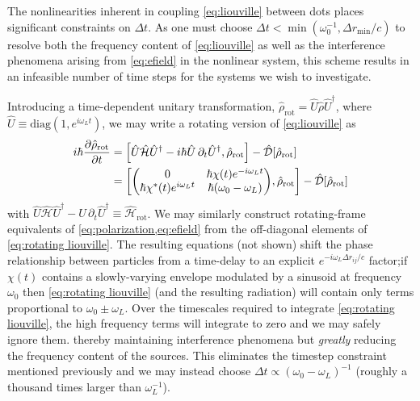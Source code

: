 \documentclass[conference]{IEEEtran}
\begin{document}
The nonlinearities inherent in coupling \cref{eq:liouville} between dots places significant constraints on $\Delta t$.
As one must choose $\Delta t < \min(\omega_0^{-1}, \Delta r_\text{min}/c)$ to resolve both the frequency content of \cref{eq:liouville} as well as the interference phenomena arising from \cref{eq:efield} in the nonlinear system, this scheme results in an infeasible number of time steps for the systems we wish to investigate.

Introducing a time-dependent unitary transformation, $\hat{\rho}_\text{rot} = \hat{U}\hat{\rho}\hat{U}^\dagger$, where $\hat{U} \equiv \text{diag}(1, e^{i \omega_L t})$,
we may write a rotating version of \cref{eq:liouville} as
\begin{equation}
  \begin{aligned}
    i \hbar \pdv{\hat{\rho}_\text{rot}}{t} &= \commutator{\hat{U} \hat{\mathcal{H}} \hat{U}^\dagger - i \hbar \hat{U} \, \partial_t \hat{U}^\dagger}{\hat{\rho}_\text{rot}} - \hat{\mathcal{D}}[\hat{\rho}_\text{rot}] \\
    &= \commutator{\mqty(0 & \hbar \chi(t)e^{-i \omega_L t} \\ \hbar \chi^*(t) e^{i \omega_L t} & \hbar\qty(\omega_0 - \omega_L))}{\hat{\rho}_\text{rot}} - \hat{\mathcal{D}}[\hat{\rho}_\text{rot}]
  \end{aligned}
  \label{eq:rotating liouville}
\end{equation}
with $\hat{U} \hat{\mathcal{H}} \hat{U}^\dagger - \hat{U} \, \partial_t \hat{U}^\dagger \equiv \hat{\mathcal{H}}_\text{rot}$.
We may similarly construct rotating-frame equivalents of \cref{eq:polarization,eq:efield} from the off-diagonal elements of \cref{eq:rotating liouville}.
The resulting equations (not shown) shift the phase relationship between particles from a time-delay to an explicit $e^{-i \omega_L \Delta r_{ij}/c}$ factor;if $\chi(t)$ contains a slowly-varying envelope modulated by a sinusoid at frequency $\omega_0$ then \cref{eq:rotating liouville} (and the resulting radiation) will contain only terms proportional to $\omega_0 \pm \omega_L$.
Over the timescales required to integrate \cref{eq:rotating liouville}, the high frequency terms will integrate to zero and we may safely ignore them.
 thereby maintaining interference phenomena but \emph{greatly} reducing the frequency content of the sources.
This eliminates the timestep constraint mentioned previously and we may instead choose $\Delta t \propto (\omega_0 - \omega_L)^{-1}$ (roughly a thousand times larger than $\omega_L^{-1}$).
\end{document}
